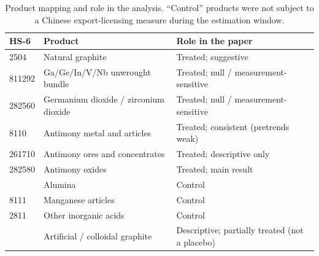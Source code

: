 \begin{table}[H]
\centering
\caption{Product mapping and role in the analysis. ``Control'' products were
not subject to a Chinese export-licensing measure during the estimation window.}
\label{tab:products}
\small
\begin{tabular}{lll}
\toprule
HS-6 & Product & Role in the paper \\
\midrule
2504    & Natural graphite                              & Treated; suggestive \\
811292  & Ga/Ge/In/V/Nb unwrought bundle               & Treated; null / measurement-sensitive \\
282560  & Germanium dioxide / zirconium dioxide         & Treated; null / measurement-sensitive \\
8110    & Antimony metal and articles                   & Treated; consistent (pretrends weak) \\
261710  & Antimony ores and concentrates                & Treated; descriptive only \\
282580  & Antimony oxides                               & Treated; main result \\
\addlinespace
2818    & Alumina                                       & Control \\
8111    & Manganese articles                            & Control \\
2811    & Other inorganic acids                         & Control \\
\addlinespace
3801    & Artificial / colloidal graphite               & Descriptive; partially treated (not a placebo) \\
\bottomrule
\end{tabular}
\end{table}

